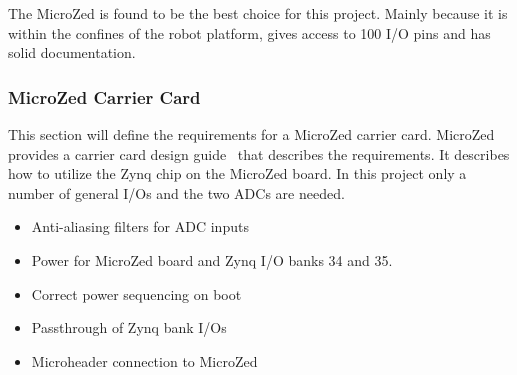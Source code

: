 The MicroZed is found to be the best choice for this project.
Mainly because it is within the confines of the robot platform, gives access to 100 I/O pins and has solid documentation.

\subsubsection*{MicroZed Carrier Card}
This section will define the requirements for a MicroZed carrier card.
MicroZed provides a carrier card design guide~\cite{design_carrier} that describes the requirements.
It describes how to utilize the Zynq chip on the MicroZed board.
In this project only a number of general I/Os and the two ADCs are needed.

\begin{itemize}
	\item Anti-aliasing filters for ADC inputs
	\item Power for MicroZed board and Zynq I/O banks 34 and 35.
	\item Correct power sequencing on boot
	\item Passthrough of Zynq bank I/Os
	\item Microheader connection to MicroZed
\end{itemize}

